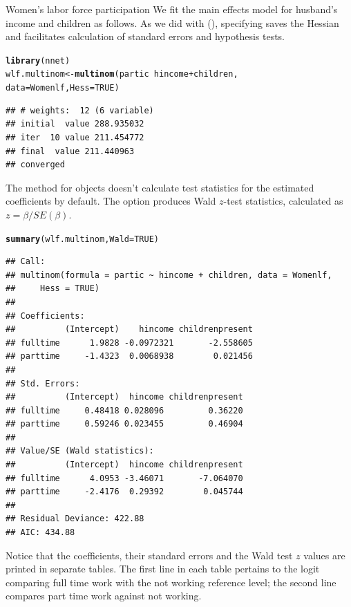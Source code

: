 \documentclass[11pt]{book}\usepackage[]{graphicx}\usepackage[]{color}
\makeatletter
\newcommand{\hlnum}[1]{\textcolor[rgb]{0.686,0.059,0.569}{#1}}%
\newcommand{\hlopt}[1]{\textcolor[rgb]{0,0,0}{#1}}%
\newcommand{\hlstd}[1]{\textcolor[rgb]{0.345,0.345,0.345}{#1}}%
\newcommand{\hlkwb}[1]{\textcolor[rgb]{0.69,0.353,0.396}{#1}}%
\newcommand{\hlkwc}[1]{\textcolor[rgb]{0.333,0.667,0.333}{#1}}%
\newcommand{\hlkwd}[1]{\textcolor[rgb]{0.737,0.353,0.396}{\textbf{#1}}}%
\newenvironment{kframe}{%
 \def\at@end@of@kframe{}%
 \ifinner\ifhmode%
  \def\at@end@of@kframe{\end{minipage}}%
  \begin{minipage}{\columnwidth}%
 \fi\fi%
 \def\FrameCommand##1{\hskip\@totalleftmargin \hskip-\fboxsep
 \colorbox{shadecolor}{##1}\hskip-\fboxsep
     \hskip-\linewidth \hskip-\@totalleftmargin \hskip\columnwidth}%
 \MakeFramed {\advance\hsize-\width
   \@totalleftmargin\z@ \linewidth\hsize
   \@setminipage}}%
 {\par\unskip\endMakeFramed%
 \at@end@of@kframe}
\newenvironment{knitrout}{}{} %
\renewenvironment{knitrout}{\small\renewcommand{\baselinestretch}{.85}}{} %
\makeatother
\begin{document}
\begin{Example}[wlfpart2]{Women's labor force participation}
We fit the main effects model for husband's income and children as follows.
As we did with  (),
specifying  saves the Hessian and facilitates calculation of
standard errors and hypothesis tests.
\begin{knitrout}
\color{fgcolor}\begin{kframe}
\begin{alltt}
\hlkwd{library}\hlstd{(nnet)}
\hlstd{wlf.multinom} \hlkwb{<-} \hlkwd{multinom}\hlstd{(partic} \hlopt{~} \hlstd{hincome} \hlopt{+} \hlstd{children,}
                         \hlkwc{data}\hlstd{=Womenlf,} \hlkwc{Hess}\hlstd{=}\hlnum{TRUE}\hlstd{)}
\end{alltt}
\begin{verbatim}
## # weights:  12 (6 variable)
## initial  value 288.935032 
## iter  10 value 211.454772
## final  value 211.440963 
## converged
\end{verbatim}
\end{kframe}
\end{knitrout}
The  method for  objects doesn't calculate test statistics
for the estimated coefficients by default.  The option  produces
Wald $z$-test statistics, calculated as $z = \beta / SE (\beta)$.
\begin{knitrout}
\color{fgcolor}\begin{kframe}
\begin{alltt}
\hlkwd{summary}\hlstd{(wlf.multinom,} \hlkwc{Wald}\hlstd{=}\hlnum{TRUE}\hlstd{)}
\end{alltt}
\begin{verbatim}
## Call:
## multinom(formula = partic ~ hincome + children, data = Womenlf, 
##     Hess = TRUE)
## 
## Coefficients:
##          (Intercept)    hincome childrenpresent
## fulltime      1.9828 -0.0972321       -2.558605
## parttime     -1.4323  0.0068938        0.021456
## 
## Std. Errors:
##          (Intercept)  hincome childrenpresent
## fulltime     0.48418 0.028096         0.36220
## parttime     0.59246 0.023455         0.46904
## 
## Value/SE (Wald statistics):
##          (Intercept)  hincome childrenpresent
## fulltime      4.0953 -3.46071       -7.064070
## parttime     -2.4176  0.29392        0.045744
## 
## Residual Deviance: 422.88 
## AIC: 434.88
\end{verbatim}
\end{kframe}
\end{knitrout}
\noindent Notice that the coefficients, their standard errors and the Wald test $z$ values are
printed in separate tables.  The first line in each table pertains to the logit
comparing full time work with the not working reference level; the second line
compares part time work against not working.


\end{Example}
\end{document}
